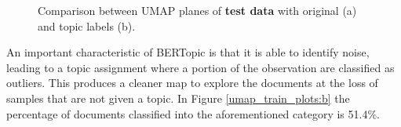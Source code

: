 \documentclass[a4paper]{article}
\begin{document}
\begin{figure}[H]
	\centering
	\caption{Comparison between UMAP planes of \textbf{test data} with original (a) and topic labels (b).}
	\label{umap_test_plots}
\end{figure}

An important characteristic of BERTopic is that it is able to identify noise, leading to a topic assignment where a portion of the observation are classified as outliers. This produces a cleaner map to explore the documents at the loss of samples that are not given a topic. In Figure \ref{umap_train_plots:b} the percentage of documents classified into the aforementioned category is 51.4\%.
\end{document}
